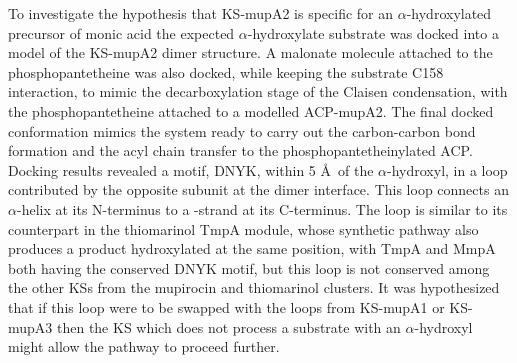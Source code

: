 	To investigate the hypothesis that KS-mupA2 is specific for an $ \alpha $-hydroxylated precursor of monic acid the expected $ \alpha $-hydroxylate substrate was docked into a model of the KS-mupA2 dimer structure. A malonate molecule attached to the phosphopantetheine was also docked, while keeping the substrate C158 interaction, to mimic the decarboxylation stage of the Claisen condensation, with the phosphopantetheine attached to a modelled ACP-mupA2. The final docked conformation mimics the system ready to carry out the carbon-carbon bond formation and the acyl chain transfer to the phosphopantetheinylated ACP. Docking results revealed a motif, DNYK, within 5 \AA \ of the $ \alpha $-hydroxyl, in a loop contributed by the opposite subunit at the dimer interface. This loop connects an $ \alpha $-helix at its N-terminus to a \bet-strand at its C-terminus. The loop is similar to its counterpart in the thiomarinol TmpA module, whose synthetic pathway also produces a product hydroxylated at the same position, with TmpA and MmpA both having the conserved DNYK motif, but this loop is not conserved among the other KSs from the mupirocin and thiomarinol clusters. It was hypothesized that if this loop were to be swapped with the loops from KS-mupA1 or KS-mupA3 then the KS which does not process a substrate with an $ \alpha $-hydroxyl might allow the pathway to proceed further.
	
